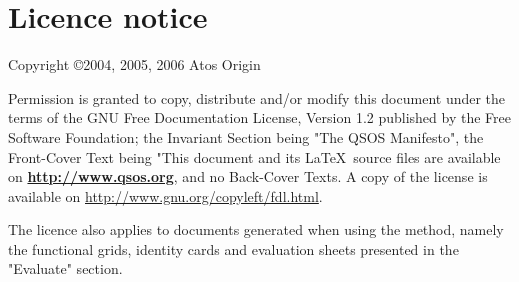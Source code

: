 %
\section{Licence notice}

Copyright \copyright 2004, 2005, 2006 Atos Origin

Permission is granted to copy, distribute and/or modify this document
under the terms of the GNU Free Documentation License, Version 1.2 published by the Free Software Foundation;
the Invariant Section being "The QSOS Manifesto", the Front-Cover Text being "This document and its \LaTeX\ source
files are available on \textbf{\url{http://www.qsos.org}}, and no Back-Cover Texts.  
A copy of the license is available on \url{http://www.gnu.org/copyleft/fdl.html}.


The licence also applies to documents generated when using the method, namely the functional grids, identity cards and evaluation sheets presented in the "Evaluate" section.
